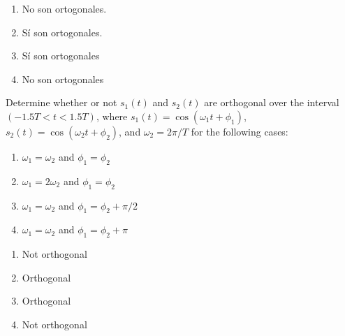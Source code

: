 \documentclass[es,boletin]{uah}
\begin{document}
{
	\begin{enumerate}
		\item No son ortogonales.
  		\item Sí son ortogonales.
    	\item Sí son ortogonales
     	\item No son ortogonales
	\end{enumerate}
}
{
	\cite{Sklar} Determine whether or not $s_1(t)$ and $s_2(t)$ are orthogonal over the interval $(-1.5T<t<1.5T)$, where $s_1(t) = \cos(\omega_1 t + \phi_1)$, $s_2(t) = \cos(\omega_2 t + \phi_2)$, and $\omega_2 = 2\pi/T$ for the following cases:

	\begin{enumerate}
		\item $\omega_1 = \omega_2$ and $\phi_1 = \phi_2$
  		\item $\omega_1 = 2 \omega_2$ and $\phi_1 = \phi_2$
    	\item $\omega_1 = \omega_2$ and $\phi_1 = \phi_2 + \pi/2$
     	\item $\omega_1 = \omega_2$ and $\phi_1 = \phi_2 + \pi$
	\end{enumerate}
}
{
	\begin{enumerate}
		\item Not orthogonal
  		\item Orthogonal
    	\item Orthogonal
     	\item Not orthogonal
	\end{enumerate}
}
\end{document}
